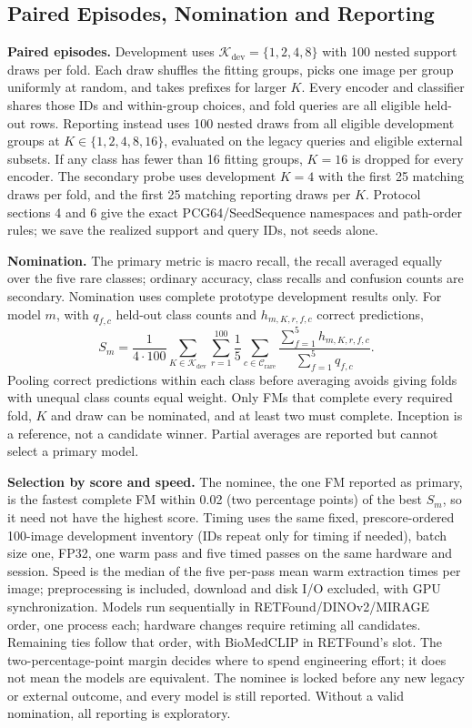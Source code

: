 \documentclass[conference]{IEEEtran}
\newcommand{\Kdev}{\mathcal{K}_{\mathrm{dev}}}
\newcommand{\rare}{\mathcal{C}_{\mathrm{rare}}}
\newcommand{\claim}[1]{} %
\begin{document}
\subsection{Paired Episodes, Nomination and Reporting}
\claim{C19}
\textbf{Paired episodes.} Development uses $\Kdev=\{1,2,4,8\}$ with 100 nested support draws per fold. Each draw shuffles the fitting groups, picks one image per group uniformly at random, and takes prefixes for larger $K$. Every encoder and classifier shares those IDs and within-group choices, and fold queries are all eligible held-out rows. Reporting instead uses 100 nested draws from all eligible development groups at $K\in\{1,2,4,8,16\}$, evaluated on the legacy queries and eligible external subsets. If any class has fewer than 16 fitting groups, $K=16$ is dropped for every encoder. The secondary probe uses development $K=4$ with the first 25 matching draws per fold, and the first 25 matching reporting draws per $K$. Protocol sections 4 and 6 give the exact PCG64/SeedSequence namespaces and path-order rules; we save the realized support and query IDs, not seeds alone.

\claim{C20}
\textbf{Nomination.} The primary metric is macro recall, the recall averaged equally over the five rare classes; ordinary accuracy, class recalls and confusion counts are secondary. Nomination uses complete prototype development results only. For model $m$, with $q_{f,c}$ held-out class counts and $h_{m,K,r,f,c}$ correct predictions,
\begin{equation}
S_m=\frac{1}{4\cdot100}\sum_{K\in\Kdev}\sum_{r=1}^{100}
\frac{1}{5}\sum_{c\in\rare}\frac{\sum_{f=1}^{5}h_{m,K,r,f,c}}{\sum_{f=1}^{5}q_{f,c}}.
\label{eq:nomination}
\end{equation}
Pooling correct predictions within each class before averaging avoids giving folds with unequal class counts equal weight. Only FMs that complete every required fold, $K$ and draw can be nominated, and at least two must complete. Inception is a reference, not a candidate winner. Partial averages are reported but cannot select a primary model.

\claim{C21}
\textbf{Selection by score and speed.} The nominee, the one FM reported as primary, is the fastest complete FM within 0.02 (two percentage points) of the best $S_m$, so it need not have the highest score. Timing uses the same fixed, prescore-ordered 100-image development inventory (IDs repeat only for timing if needed), batch size one, FP32, one warm pass and five timed passes on the same hardware and session. Speed is the median of the five per-pass mean warm extraction times per image; preprocessing is included, download and disk I/O excluded, with GPU synchronization. Models run sequentially in RETFound/DINOv2/MIRAGE order, one process each; hardware changes require retiming all candidates. Remaining ties follow that order, with BioMedCLIP in RETFound's slot. The two-percentage-point margin decides where to spend engineering effort; it does not mean the models are equivalent. The nominee is locked before any new legacy or external outcome, and every model is still reported. Without a valid nomination, all reporting is exploratory.
\end{document}
